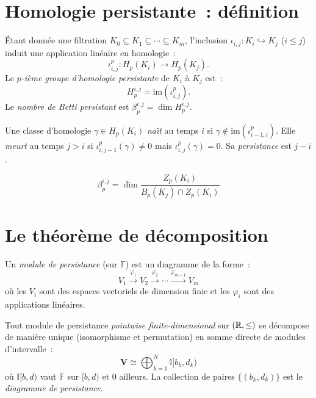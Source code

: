 \section{Homologie persistante~: d\'efinition}

\begin{definition}
\'Etant donn\'ee une filtration $K_0 \subseteq K_1 \subseteq \cdots
\subseteq K_m$, l'inclusion $\iota_{i,j} : K_i \hookrightarrow K_j$
($i \leq j$) induit une application lin\'eaire en homologie~:
\[
  \iota_{i,j}^p : H_p(K_i) \to H_p(K_j).
\]
Le \emph{$p$-i\`eme groupe d'homologie persistante} de $K_i$ \`a $K_j$
est~:
\[
  H_p^{i,j} = \mathrm{im}(\iota_{i,j}^p).
\]
Le \emph{nombre de Betti persistant} est
$\beta_p^{i,j} = \dim H_p^{i,j}$.
\end{definition}

\begin{definition}
Une classe d'homologie $\gamma \in H_p(K_i)$ \emph{na\^{\i}t} au
temps $i$ si $\gamma \notin \mathrm{im}(\iota_{i-1,i}^p)$.
Elle \emph{meurt} au temps $j > i$ si
$\iota_{i,j-1}^p(\gamma) \neq 0$ mais $\iota_{i,j}^p(\gamma) = 0$.
Sa \emph{persistance} est $j - i$.
\end{definition}

\begin{formules}[title=\textbf{Nombres de Betti persistants}]
\[
  \beta_p^{i,j} = \dim \frac{Z_p(K_i)}{B_p(K_j) \cap Z_p(K_i)}
\]
\end{formules}

\section{Le th\'eor\`eme de d\'ecomposition}

\begin{definition}
Un \emph{module de persistance} (sur $\mathbb{F}$) est un diagramme
de la forme~:
\[
  V_1 \xrightarrow{\varphi_1} V_2 \xrightarrow{\varphi_2}
  \cdots \xrightarrow{\varphi_{m-1}} V_m
\]
o\`u les $V_i$ sont des espaces vectoriels de dimension finie et les
$\varphi_i$ sont des applications lin\'eaires.
\end{definition}

\begin{theoreme}
Tout module de persistance \emph{pointwise finite-dimensional} sur
$(\mathbb{R}, \leq)$ se d\'ecompose de mani\`ere unique (isomorphisme et
permutation) en somme directe de modules d'intervalle~:
\[
  \mathbf{V} \cong \bigoplus_{k=1}^{N} \mathbb{I}[b_k, d_k)
\]
o\`u $\mathbb{I}[b, d)$ vaut $\mathbb{F}$ sur $[b, d)$ et $0$
ailleurs. La collection de paires $\{(b_k, d_k)\}$ est le
\emph{diagramme de persistance}.
\end{theoreme}

